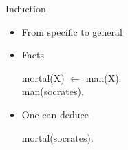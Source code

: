 
\begin{frame}{Induction}
\vfill
\begin{itemize}
    \item From specific to general
    \item Facts
    \begin{center}
        mortal(X) $\leftarrow$ man(X).\\
        man(socrates).
    \end{center}
\vfill
    \item One can deduce
    \begin{center}
        mortal(socrates).
    \end{center}
\end{itemize}
\vfill    
    
\end{frame}
